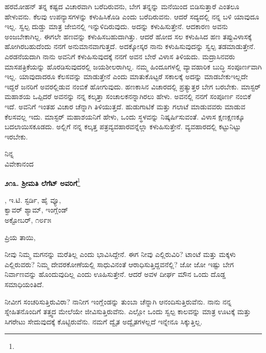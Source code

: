 ಹರಮೋಹನ್ ತನ್ನ ಕಷ್ಟದ ವಿಚಾರವಾಗಿ ಬರೆದಿರುವನು, ಬೇಗ ತನ್ನನ್ನು ಮನೆಯಿಂದ ಬಿಡಿಸುತ್ತಾರೆ ಎಂತಲೂ ಹೇಳುವನು. ಕೆಲವು ಉಪನ್ಯಾಸಗಳನ್ನು ಕಳುಹಿಸಿಕೊಡಿ ಎಂದು ಬರೆದಿರುವನು. ಆದರೆ ಸದ್ಯದಲ್ಲಿ ನನ್ನ ಬಳಿ ಯಾವುದೂ ಇಲ್ಲ. ಸ್ವಲ್ಪ ದುಡ್ಡು ಮಾತ್ರ ಜೇಬಿನಲ್ಲಿ ಇನ್ನುಳಿದಿರುವುದು. ಅದನ್ನು ಕಳುಹಿಸುತ್ತೇನೆ. ಆದಕಾರಣ ಅವನು ಅಂಜಬೇಕಾಗಿಲ್ಲ. ಈಗಲೇ ಹಣವನ್ನು ಕಳುಹಿಸಬಹುದಾಗಿತ್ತು. ಆದರೆ ಹೋದ ಸಲ ಕಳುಹಿಸಿದ ಹಣ ತಪ್ಪುವಿಳಾಸಕ್ಕೆ ಹೋಗಿರಬಹುದೆಂದು ನನಗೆ ಅನುಮಾನವಾಗುತ್ತದೆ. ಅದಕ್ಕೋಸ್ಕರ ನಾನು ಕಳುಹಿಸುವುದನ್ನು ಸ್ವಲ್ಪ ತಡಮಾಡುತ್ತೇನೆ. ಎರಡನೆಯದಾಗಿ ನಾನು ಅವನಿಗೆ ಕಳುಹಿಸುವುದಕ್ಕೆ ನನಗೆ ಅವನ ಬೇರೆ ವಿಳಾಸ ತಿಳಿಯದು. ಮದ್ರಾಸಿನವರು ಮಾಸಪತ್ರಿಕೆಯನ್ನು ಹೊರಡಿಸುವುದರಲ್ಲಿ ಜಯಶೀಲರಾಗಿಲ್ಲ. ನಮ್ಮ ಹಿಂದೂಗಳಲ್ಲಿ ವ್ಯಾವಹಾರಿಕ ಬುದ್ಧಿ ಸಂಪೂರ್ಣವಾಗಿ ಇಲ್ಲ. ಯಾವುದಾದರೂ ಕೆಲಸವನ್ನು ಮಾಡುತ್ತೇನೆ ಎಂದು ಮಾತುಕೊಟ್ಟರೆ ಸಕಾಲಕ್ಕೆ ಅದನ್ನು ಮಾಡಬೇಕು\enginline{-}ಇಲ್ಲದೇ ಇದ್ದರೆ ಜನರಿಗೆ ಅವರಲ್ಲಿಡುವ ನಂಬಿಕೆ ಹೋಗುವುದು. ಹಣಕಾಸಿನ ವಿಚಾರದಲ್ಲಿ ಪ್ರತ್ಯುತ್ತರ ಬೇಗ ಬರಬೇಕು. ಮಾಸ್ಟರ್ ಮಹಾಶಯ ಒಪ್ಪಿದರೆ ಅವನನ್ನು ನನ್ನ ಕಲ್ಕತ್ತಾ ಸಂಚಾಲಕನನ್ನಾಗಿರಲು ಹೇಳು. ಅವನಲ್ಲಿ ನನಗೆ ಸಂಪೂರ್ಣ ನಂಬಿಕೆ ಇದೆ. ಅವನಿಗೆ ಇಂತಹ ವಿಚಾರ ಚೆನ್ನಾಗಿ ತಿಳಿಯುತ್ತದೆ. ಹುಡುಗಾಟಿಕೆ ಮತ್ತು ಗಲಾಟೆ ಮಾಡುವವರು ಮಾಡುವ ಕೆಲಸವಲ್ಲ ಇದು. ಮಾಸ್ಟರ್ ಮಹಾಶಯನಿಗೆ ಹೇಳು, ಒಂದು ಸ್ಥಳವನ್ನು ನಿಷ್ಕರ್ಷಿಸುವಂತೆ. ವಿಳಾಸ ಕ್ಷಣಕ್ಷಣಕ್ಕೂ ಬದಲಾಯಿಸಕೂಡದು. ಅಲ್ಲಿಗೆ ನನ್ನ ಕಲ್ಕತ್ತ ಪತ್ರವ್ಯವಹಾರವನ್ನೆಲ್ಲಾ ಕಳುಹಿಸುತ್ತೇನೆ. ವ್ಯವಹಾರದಲ್ಲಿ ಕಟ್ಟುನಿಟ್ಟು ಇರಬೇಕು.

{\flushright
ನಿನ್ನ\\ವಿವೇಕಾನಂದ\par}

\newpage

\begin{center}
\textbf{೨೧೩. ಶ‍್ರೀಮತಿ ಲೆಗೆಟ್ ಅವರಿಗೆ}\footnote{}
\end{center}

\begin{flushright}
, ಇ.ಟಿ. ಸ್ಟರ್ಡಿ, ಹೈ ವ್ಯೂ,\\ಕ್ವಾವರ್ ಶ್ಯಾಮ್, ಇಂಗ್ಲೆಂಡ್\\ಅಕ್ಟೋಬರ್, ೧೮೯೫
\end{flushright}


\noindent
ಪ್ರಿಯ ತಾಯಿ,

ನೀವು ನಿಮ್ಮ ಮಗನನ್ನು ಮರೆತಿಲ್ಲ ಎಂದು ಭಾವಿಸಿದ್ದೇನೆ. ಈಗ ನೀವು ಎಲ್ಲಿರುವಿರಿ? ಟಾಂಟೆ ಮತ್ತು ಮಕ್ಕಳು ಎಲ್ಲಿರುವರು? ನಿಮ್ಮ ದೇವರಕೋಣೆಯಲ್ಲಿ ಸಾಧುವಿನಂತೆ ಆರಾಧಿಸುತ್ತಿದ್ದವನೆಲ್ಲಿ? ಜೋ ಜೋ ಇಷ್ಟು ಬೇಗ ನಿರ್ವಾಣವನ್ನು ಹೊಂದುವುದಿಲ್ಲ ಎಂದು ಊಹಿಸುತ್ತೇನೆ. ಆದರೆ ಅವಳ ದೀರ್ಘ ಮೌನ ಒಂದು ದೊಡ್ಡ ಸಮಾಧಿಯಂತಿದೆ.

ನೀವೀಗ ಸಂಚರಿಸುತ್ತಿರುವಿರಾ? ನಾನೀಗ ಇಂಗ್ಲೆಂಡನ್ನು ತುಂಬಾ ಚೆನ್ನಾಗಿ ಆನಂದಿಸು\break ತ್ತಿರುವೆನು. ನಾನು ನನ್ನ ಸ್ನೇಹಿತನೊಂದಿಗೆ ತತ್ತ್ವದ ಮೇಲೆಯೇ ಜೀವಿಸುತ್ತಿರುವೆನು. ಎಲ್ಲೋ ಒಂದು ಸ್ವಲ್ಪ ಕಾಲವನ್ನು ಮಾತ್ರ ಊಟಕ್ಕೆ ಮತ್ತು ಸಿಗರೇಟು ಸೇದುವುದಕ್ಕೆ ಕೊಟ್ಟಿರುವೆನು. ನಮಗೆ ದ್ವೈತ ಅದ್ವೈತಗಳಲ್ಲದೆ ಇನ್ನೇನೂ ಸಿಕ್ಕುತ್ತಿಲ್ಲ.

